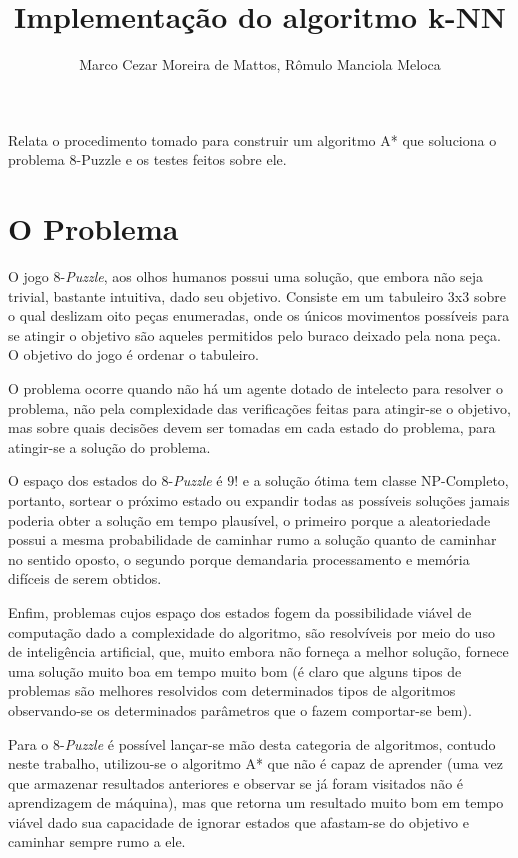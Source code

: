 \documentclass[12pt]{article}
\title{Implementação do algoritmo k-NN}
\author{Marco Cezar Moreira de Mattos\inst{1}, Rômulo Manciola Meloca\inst{1}}
\begin{document}
	\maketitle

	\begin{resumo}
		Relata o procedimento tomado para construir um algoritmo A* que soluciona o problema 8-Puzzle e os testes feitos sobre ele.
	\end{resumo}

	\section{O Problema}\label{sec:problema}

		O jogo 8-\textit{Puzzle}, aos olhos humanos possui uma solução, que embora não seja trivial, bastante intuitiva, dado seu objetivo. Consiste em um tabuleiro 3x3 sobre o qual deslizam oito peças enumeradas, onde os únicos movimentos possíveis para se atingir o objetivo são aqueles permitidos pelo buraco deixado pela nona peça. O objetivo do jogo é ordenar o tabuleiro.

		O problema ocorre quando não há um agente dotado de intelecto para resolver o problema, não pela complexidade das verificações feitas para atingir-se o objetivo, mas sobre quais decisões devem ser tomadas em cada estado do problema, para atingir-se a solução do problema.

		O espaço dos estados do 8-\textit{Puzzle} é $9!$ e a solução ótima tem classe NP-Completo, portanto, sortear o próximo estado ou expandir todas as possíveis soluções jamais poderia obter a solução em tempo plausível, o primeiro porque a aleatoriedade possui a mesma probabilidade de caminhar rumo a solução quanto de caminhar no sentido oposto, o segundo porque demandaria processamento e memória difíceis de serem obtidos.

		Enfim, problemas cujos espaço dos estados fogem da possibilidade viável de computação dado a complexidade do algoritmo, são resolvíveis por meio do uso de inteligência artificial, que, muito embora não forneça a melhor solução, fornece uma solução muito boa em tempo muito bom (é claro que alguns tipos de problemas são melhores resolvidos com determinados tipos de algoritmos observando-se os determinados parâmetros que o fazem comportar-se bem).

		Para o 8-\textit{Puzzle} é possível lançar-se mão desta categoria de algoritmos, contudo neste trabalho, utilizou-se o algoritmo A* que não é capaz de aprender (uma vez que armazenar resultados anteriores e observar se já foram visitados não é aprendizagem de máquina), mas que retorna um resultado muito bom em tempo viável dado sua capacidade de ignorar estados que afastam-se do objetivo e caminhar sempre rumo a ele.
\end{document}
